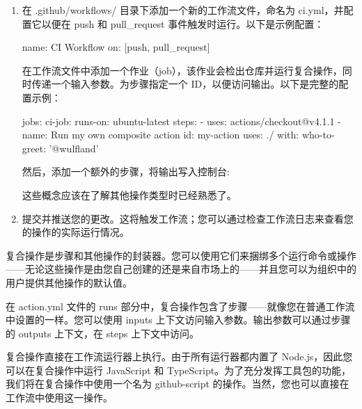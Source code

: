 \begin{enumerate}
\item 
在 .github/workflows/ 目录下添加一个新的工作流文件，命名为 ci.yml，并配置它以便在 push 和 pull\_request 事件触发时运行。以下是示例配置：

\begin{shell}
name: CI Workflow
on: [push, pull_request]
\end{shell}

在工作流文件中添加一个作业（job），该作业会检出仓库并运行复合操作，同时传递一个输入参数。为步骤指定一个 ID，以便访问输出。以下是完整的配置示例：

\begin{shell}
jobs:
  ci-job:
    runs-on: ubuntu-latest
    steps:
      - uses: actions/checkout@v4.1.1
      - name: Run my own composite action
        id: my-action
        uses: ./
        with:
          who-to-greet: '@wulfland'
\end{shell}

然后，添加一个额外的步骤，将输出写入控制台:


这些概念应该在了解其他操作类型时已经熟悉了。

\item 
提交并推送您的更改。这将触发工作流；您可以通过检查工作流日志来查看您的操作的实际运行情况。
\end{enumerate}


复合操作是步骤和其他操作的封装器。您可以使用它们来捆绑多个运行命令或操作——无论这些操作是由您自己创建的还是来自市场上的——并且您可以为组织中的用户提供其他操作的默认值。

在 action.yml 文件的 runs 部分中，复合操作包含了步骤——就像您在普通工作流中设置的一样。您可以使用 inputs 上下文访问输入参数。输出参数可以通过步骤的 outputs 上下文，在 steps 上下文中访问。


复合操作直接在工作流运行器上执行。由于所有运行器都内置了 Node.js，因此您可以在复合操作中运行 JavaScript 和 TypeScript。为了充分发挥工具包的功能，我们将在复合操作中使用一个名为 github-script 的操作。当然，您也可以直接在工作流中使用这一操作。